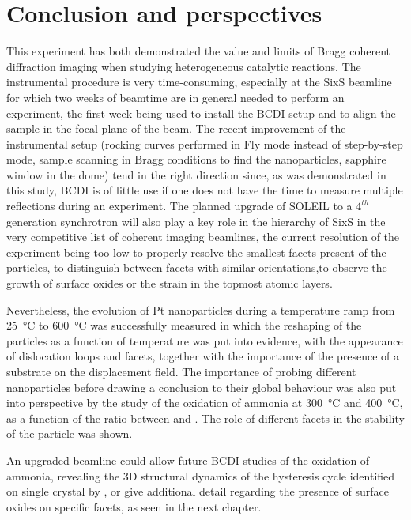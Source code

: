 \section{Conclusion and perspectives}

This experiment has both demonstrated the value and limits of Bragg coherent diffraction imaging when studying heterogeneous catalytic reactions.
The instrumental procedure is very time-consuming, especially at the SixS beamline for which two weeks of beamtime are in general needed to perform an experiment, the first week being used to install the BCDI setup and to align the sample in the focal plane of the beam.
The recent improvement of the instrumental setup (rocking curves performed in Fly mode instead of step-by-step mode, sample scanning in Bragg conditions to find the nanoparticles, sapphire window in the dome) tend in the right direction since, as was demonstrated in this study, BCDI is of little use if one does not have the time to measure multiple reflections during an experiment.
The planned upgrade of SOLEIL to a $4^{th}$ generation synchrotron will also play a key role in the hierarchy of SixS in the very competitive list of coherent imaging beamlines, the current resolution of the experiment being too low to properly resolve the smallest facets present of the particles, to distinguish between facets with similar orientations,to observe the growth of surface oxides or the strain in the topmost atomic layers.

Nevertheless, the evolution of Pt nanoparticles during a temperature ramp from \qty{25}{\degreeCelsius} to \qty{600}{\degreeCelsius} was successfully measured in which the reshaping of the particles as a function of temperature was put into evidence, with the appearance of dislocation loops and facets, together with the importance of the presence of a substrate on the displacement field.
The importance of probing different nanoparticles before drawing a conclusion to their global behaviour was also put into perspective by the study of the oxidation of ammonia at \qty{300}{\degreeCelsius} and \qty{400}{\degreeCelsius}, as a function of the ratio between  and \ammonia.
The role of different facets in the stability of the particle was shown.

An upgraded beamline could allow future BCDI studies of the oxidation of ammonia, revealing the 3D structural dynamics of the hysteresis cycle identified on single crystal by \cite{Resta2020a}, or give additional detail regarding the presence of surface oxides on specific facets, as seen in the next chapter.